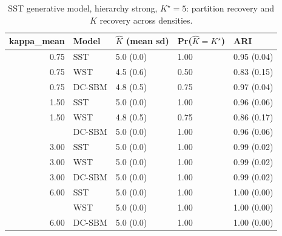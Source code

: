 \begin{table}
\centering
\caption{SST generative model, hierarchy strong, $K^\star=5$: partition recovery and $K$ recovery across densities.}
\centering
\begin{tabular}[t]{rllll}
\toprule
kappa_mean & Model & $\hat K$ (mean sd) & Pr($\hat K = K^\star$) & ARI\\
\midrule
0.75 & SST & 5.0 (0.0) & 1.00 & 0.95 (0.04)\\
0.75 & WST & 4.5 (0.6) & 0.50 & 0.83 (0.15)\\
0.75 & DC-SBM & 4.8 (0.5) & 0.75 & 0.97 (0.04)\\
1.50 & SST & 5.0 (0.0) & 1.00 & 0.96 (0.06)\\
1.50 & WST & 4.8 (0.5) & 0.75 & 0.86 (0.17)\\
\addlinespace
1.50 & DC-SBM & 5.0 (0.0) & 1.00 & 0.96 (0.06)\\
3.00 & SST & 5.0 (0.0) & 1.00 & 0.99 (0.02)\\
3.00 & WST & 5.0 (0.0) & 1.00 & 0.99 (0.02)\\
3.00 & DC-SBM & 5.0 (0.0) & 1.00 & 0.99 (0.02)\\
6.00 & SST & 5.0 (0.0) & 1.00 & 1.00 (0.00)\\
\addlinespace
6.00 & WST & 5.0 (0.0) & 1.00 & 1.00 (0.00)\\
6.00 & DC-SBM & 5.0 (0.0) & 1.00 & 1.00 (0.00)\\
\bottomrule
\end{tabular}
\end{table}
